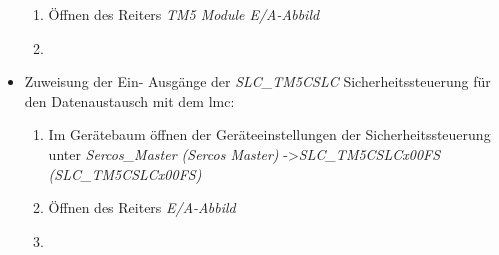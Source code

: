 \documentclass[../../../Bachelorarbeit.tex]{subfiles}
\begin{document}
\begin{itemize}
\begin{enumerate}
        \item \normalsize Öffnen des Reiters \textit{TM5 Module E/A-Abbild}
        \item \begin{minipage}[t]{\linewidth}
            \raggedright
            \label{fig:my-img31}
        \end{minipage}
    \end{enumerate}
    \item Zuweisung der Ein- \bzw Ausgänge der \textit{SLC\_TM5CSLC} Sicherheitssteuerung für den Datenaustausch mit dem \acs{lmc}:
    \begin{enumerate}
        \item Im Gerätebaum öffnen der Geräteeinstellungen der Sicherheitssteuerung unter \textit{Sercos\_Master (Sercos Master)} ->\small \textit{SLC\_TM5CSLCx00FS (SLC\_TM5CSLCx00FS)}
        \item \normalsize Öffnen des Reiters \textit{E/A-Abbild}
        \item \begin{minipage}[t]{\linewidth}
            \raggedright

\end{minipage}
\end{enumerate}
\end{itemize}
\end{document}
